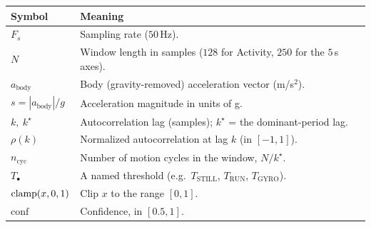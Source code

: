 \begin{center}
\begin{tabular}{@{}l >{\raggedright\arraybackslash}p{10.8cm}@{}}
\toprule
\textbf{Symbol} & \textbf{Meaning} \\
\midrule
$F_s$ & Sampling rate ($50$\,Hz). \\
$N$ & Window length in samples ($128$ for Activity, $250$ for the $5$\,s axes). \\
$a_\text{body}$ & Body (gravity-removed) acceleration vector (m/s$^2$). \\
$s = |a_\text{body}|/g$ & Acceleration magnitude in units of g. \\
$k,\ k^\star$ & Autocorrelation lag (samples); $k^\star$ = the dominant-period lag. \\
$\rho(k)$ & Normalized autocorrelation at lag $k$ (in $[-1,1]$). \\
$n_\text{cyc}$ & Number of motion cycles in the window, $N/k^\star$. \\
$T_{\bullet}$ & A named threshold (e.g.\ $T_\text{STILL}$, $T_\text{RUN}$, $T_\text{GYRO}$). \\
$\operatorname{clamp}(x,0,1)$ & Clip $x$ to the range $[0,1]$. \\
$\text{conf}$ & Confidence, in $[0.5,1]$. \\
\bottomrule
\end{tabular}
\end{center}
